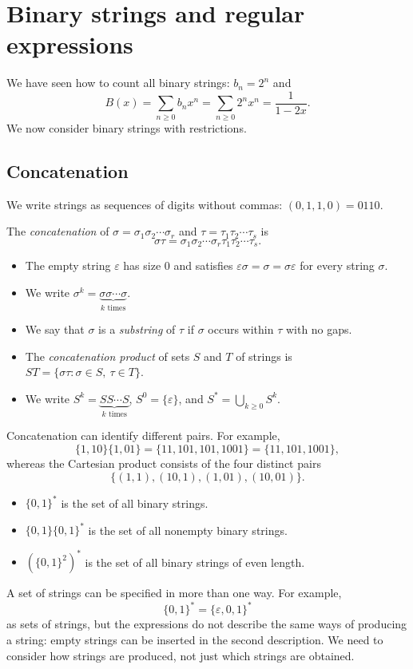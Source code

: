 \section{Binary strings and regular expressions}
We have seen how to count all binary strings: $b_n=2^n$ and
\[
B(x)=\sum_{n\ge0}b_nx^n=\sum_{n\ge0}2^nx^n=\frac1{1-2x}.
\]
We now consider binary strings with restrictions.

\subsection{Concatenation}
We write strings as sequences of digits without commas: $(0,1,1,0)=0110$.
\begin{definition}
The \textit{concatenation} of $\sigma=\sigma_1\sigma_2\cdots\sigma_r$ and $\tau=\tau_1\tau_2\cdots\tau_s$ is
\[
\sigma\tau=\sigma_1\sigma_2\cdots\sigma_r\tau_1\tau_2\cdots\tau_s.
\]
\end{definition}
\begin{itemize}
\item The empty string $\varepsilon$ has size $0$ and satisfies $\varepsilon\sigma=\sigma=\sigma\varepsilon$ for every string $\sigma$.
\item We write $\sigma^k=\underbrace{\sigma\sigma\cdots\sigma}_{k\text{ times}}$.
\item We say that $\sigma$ is a \textit{substring} of $\tau$ if $\sigma$ occurs within $\tau$ with no gaps.
\item The \textit{concatenation product} of sets $S$ and $T$ of strings is $ST=\{\sigma\tau:\sigma\in S,\ \tau\in T\}$.
\item We write $S^k=\underbrace{SS\cdots S}_{k\text{ times}}$, $S^0=\{\varepsilon\}$, and $\displaystyle S^*=\bigcup_{k\ge0}S^k$.
\end{itemize}
\begin{remark}
Concatenation can identify different pairs. For example,
\[
\{1,10\}\{1,01\}=\{11,101,101,1001\}=\{11,101,1001\},
\]
whereas the Cartesian product consists of the four distinct pairs
\[
\{(1,1),(10,1),(1,01),(10,01)\}.
\]
\end{remark}
\begin{example}
\begin{itemize}
\item $\{0,1\}^*$ is the set of all binary strings.
\item $\{0,1\}\{0,1\}^*$ is the set of all nonempty binary strings.
\item $(\{0,1\}^2)^*$ is the set of all binary strings of even length.
\end{itemize}
\end{example}
A set of strings can be specified in more than one way. For example,
\[
\{0,1\}^*=\{\varepsilon,0,1\}^*
\]
as sets of strings, but the expressions do not describe the same ways of producing a string: empty strings can be inserted in the second description. We need to consider how strings are produced, not just which strings are obtained.

